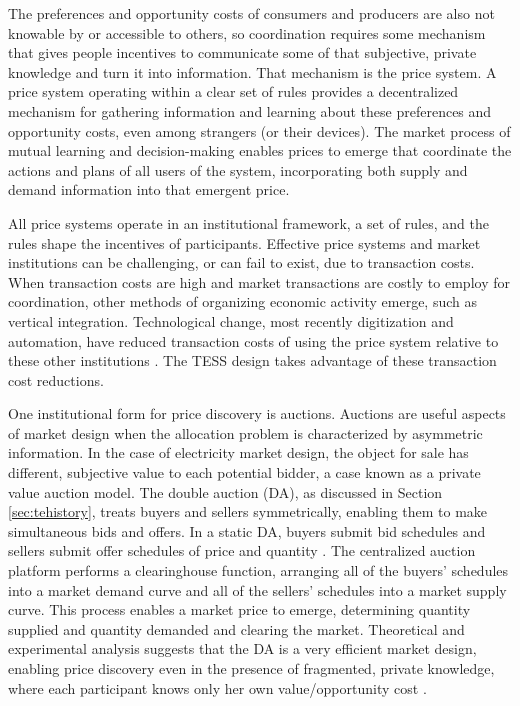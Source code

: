 \documentclass[12pt]{article}{Definitions/mdpi}
\begin{document}
The preferences and opportunity costs of consumers and producers are also not knowable by or accessible to others, so coordination requires some mechanism that gives people incentives to communicate some of that subjective, private knowledge and turn it into information. That mechanism is the price system. A price system operating within a clear set of rules provides a decentralized mechanism for gathering information and learning about these preferences and opportunity costs, even among strangers (or their devices). The market process of mutual learning and decision-making enables prices to emerge that coordinate the actions and plans of all users of the system, incorporating both supply and demand information into that emergent price.

All price systems operate in an institutional framework, a set of rules, and the rules shape the incentives of participants. Effective price systems and market institutions can be challenging, or can fail to exist, due to transaction costs. When transaction costs are high and market transactions are costly to employ for coordination, other methods of organizing economic activity emerge, such as vertical integration. Technological change, most recently digitization and automation, have reduced transaction costs of using the price system relative to these other institutions \citep{kiesling_2016}. The TESS design takes advantage of these transaction cost reductions.

One institutional form for price discovery is auctions. Auctions are useful aspects of market design when the allocation problem is characterized by asymmetric information. In the case of electricity market design, the object for sale has different, subjective value to each potential bidder, a case known as a private value auction model. The double auction (DA), as discussed in Section \ref{sec:tehistory}, treats buyers and sellers symmetrically, enabling them to make simultaneous bids and offers. In a static DA, buyers submit bid schedules and sellers submit offer schedules of price and quantity \citep{friedman1993double}. The centralized auction platform performs a clearinghouse function, arranging all of the buyers’ schedules into a market demand curve and all of the sellers’ schedules into a market supply curve. 
This process enables a market price to emerge, determining quantity supplied and quantity demanded and clearing the market. 
Theoretical and experimental analysis suggests that the DA is a very efficient market design, enabling price discovery even in the presence of fragmented, private knowledge, where each participant knows only her own value/opportunity cost \citep{easley1993theories}.
\end{document}
